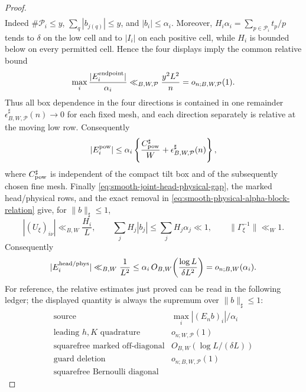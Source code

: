\documentclass[11pt]{article}
\numberwithin{equation}{section}
\theoremstyle{definition}
\theoremstyle{remark}
\newcommand{\1}{\mathbf 1}
\begin{document}
\begin{proof}
\begin{align}
 \label{eq:smooth-sharp-four-endpoint-directions}
\end{align}
Indeed \(\#\mathcal P_i\leq y\),
\(\sum_q|b_{j(q)}|\leq y\), and \(|b_i|\leq\alpha_i\).  Moreover,
\(H_i\alpha_i=\sum_{p\in\mathcal P_i}t_p/p\) tends to \(\delta\) on
the low cell and to \(|I_i|\) on each positive cell, while \(H_i\) is
bounded below on every permitted cell.  Hence the four displays imply
the common relative bound
\begin{equation}
 \max_i\frac{|E_i^{\rm endpoint}|}{\alpha_i}
 \ll_{B,W,\mathcal P}\frac{y^2L^2}{n}
       =o_{n;B,W,\mathcal P}(1).
 \label{eq:smooth-sharp-four-power-endpoints}
\end{equation}
Thus all box dependence in the four directions is contained in one
remainder
\(\epsilon^{\sharp}_{B,W,\mathcal P}(n)\to0\) for each fixed mesh, and
each direction separately is relative at the moving low row.
Consequently
\begin{equation}
 |E_i^{\rm pow}|
 \le\alpha_i\left\{\frac{C_{\rm pow}^{\sharp}}W
       +\epsilon^{\sharp}_{B,W,\mathcal P}(n)\right\},
 \label{eq:smooth-sharp-power-transfer}
\end{equation}
where \(C_{\rm pow}^{\sharp}\) is independent of the compact tilt box
and of the subsequently chosen fine mesh.
Finally \eqref{eq:smooth-joint-head-physical-gap}, the marked
head/physical rows, and the exact removal in
\eqref{eq:smooth-physical-alpha-block-relation} give, for
\(\|b\|_\sharp\leq1\),
\[
 |(U_\xi)_{i\nu}|\ll_{B,W}\frac{H_i}{L},\qquad
 \sum_jH_j|b_j|\leq\sum_jH_j\alpha_j\ll1,
 \qquad \|\Gamma_\xi^{-1}\|\ll_W1.
\]
Consequently
\begin{equation}
 |E_i^{\rm head/phys}|
 \ll_{B,W}\frac1{L^2}
 \leq\alpha_i\,O_{B,W}\!\left(\frac{\log L}{\delta L^2}\right)
 =o_{n;B,W}(\alpha_i).
 \label{eq:smooth-sharp-head-physical-transfer}
\end{equation}
For reference, the relative estimates just proved can be read in the
following ledger; the displayed quantity is always the supremum over
\(\|b\|_\sharp\leq1\):
\[
\begin{array}{c|c}
 \text{source}&
 \displaystyle\max_i |(E_nb)_i|/\alpha_i\\ \hline
 \text{leading \(h,K\) quadrature}
   &o_{n;W,\mathcal P}(1)\\
 \text{squarefree marked off-diagonal}
   &O_{B,W}(\log L/(\delta L))\\
 \text{guard deletion}
   &o_{n;B,W,\mathcal P}(1)\\
 \text{squarefree Bernoulli diagonal}

\end{array}\]
\end{proof}
\end{document}
